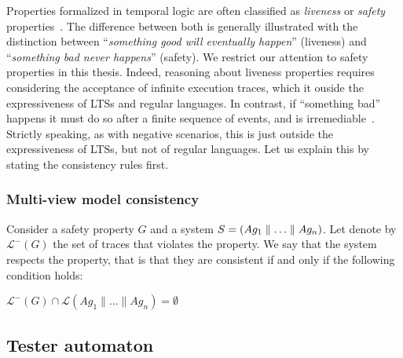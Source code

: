 Properties formalized in temporal logic are often classified as \emph{liveness} or \emph{safety} properties~\cite{Alpern:1986}. The difference between both is generally illustrated with the distinction between ``\emph{something good will eventually happen}'' (liveness) and  ``\emph{something bad never happens}'' (safety). We restrict our attention to safety properties in this thesis. Indeed, reasoning about liveness properties requires considering the acceptance of infinite execution traces, which it ouside the expressiveness of LTSs and regular languages. In contrast, if ``something bad'' happens it must do so after a finite sequence of events, and is irremediable~\cite{Alpern:1986, Giannakopoulou:1999}. Strictly speaking, as with negative scenarios, this is just outside the expressiveness of LTSs, but not of regular languages. Let us explain this by stating the consistency rules first.

\subsubsection*{Multi-view model consistency}

Consider a safety property $G$ and a system $S = (Ag_1 \parallel \ldots \parallel Ag_n)$. Let denote by $\mathcal{L}^{-}(G)$ the set of traces that violates the property. We say that the system respects the property, that is that they are consistent if and only if the following condition holds:

\begin{center}
$\mathcal{L}^{-}(G) \cap \mathcal{L}(Ag_1 \parallel \ldots \parallel Ag_n) = \emptyset$
\end{center}

\subsection{Tester automaton}

